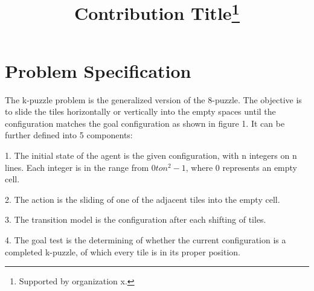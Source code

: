 \documentclass[runningheads]{llncs}
\begin{document}
%
\title{Contribution Title\thanks{Supported by organization x.}}
%
%

%
%
%
\maketitle              %
%


%
%
%
\section{Problem Specification}

The k-puzzle problem is the generalized version of the 8-puzzle. The objective is to slide the tiles horizontally or vertically into the empty spaces until the configuration matches the goal configuration as shown in figure 1. It can be further defined into 5 components:


1. The initial state of the agent is the given configuration, with n integers on n lines. Each integer is in the range from $0 to n^2 - 1$, where 0 represents an empty cell.

2. The action is the sliding of one of the adjacent tiles into the empty cell.

3. The transition model is the configuration after each shifting of tiles.

4. The goal test is the determining of whether the current configuration is a completed k-puzzle, of which every tile is in its proper position.
\end{document}
